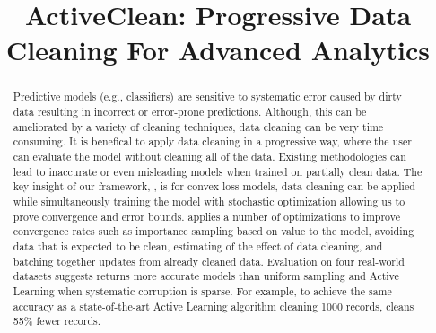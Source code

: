 \documentclass{sig-alternate}
\begin{document}
\newcommand{\reminder}[1]{{{\textcolor{magenta}{\{\{\bf #1\}\}}}\xspace}}
\newcommand{\specialcell}[2][c]{%
  \begin{tabular}[#1]{@{}c@{}}#2\end{tabular}}

\def\ojoin{\setbox0=\hbox{$\bowtie$}%
  \rule[-.02ex]{.25em}{.4pt}\llap{\rule[\ht0]{.25em}{.4pt}}}
\def\leftouterjoin{\mathbin{\ojoin\mkern-5.8mu\bowtie}}
\def\rightouterjoin{\mathbin{\bowtie\mkern-5.8mu\ojoin}}
\def\fullouterjoin{\mathbin{\ojoin\mkern-5.8mu\bowtie\mkern-5.8mu\ojoin}}


\pagestyle{plain}

\title{ActiveClean: Progressive Data Cleaning For Advanced Analytics}



%

\maketitle

\begin{abstract}
Predictive models (e.g., classifiers) are sensitive to systematic error caused by dirty data resulting in incorrect or error-prone predictions.
Although, this can be ameliorated by a variety of cleaning techniques, data cleaning can be very time consuming.
It is benefical to apply data cleaning in a progressive way, where the user can evaluate the model without cleaning all of the data.
Existing methodologies can lead to inaccurate or even misleading models when trained on partially clean data.
The key insight of our framework, \sys, is for convex loss models, data cleaning can be applied while simultaneously training the model with stochastic optimization allowing us to prove convergence and error bounds.
\sys applies a number of optimizations to improve convergence rates such as importance sampling based on value to the model, avoiding data that is expected to be clean, estimating of the effect of data cleaning, and batching together updates from already cleaned data.
Evaluation on four real-world datasets suggests \sys returns more accurate models than uniform sampling and Active Learning when systematic corruption is sparse. 
For example, to achieve the same accuracy as a state-of-the-art Active Learning algorithm cleaning 1000 records, \sys cleans 55\% fewer records.
\end{abstract}
\end{document}
